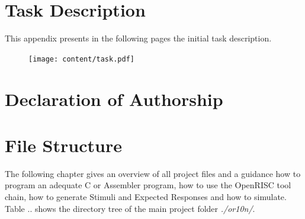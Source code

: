 
\chapter{Task Description}
This appendix presents in the following pages the initial task description. 

\begin{figure}[h!]
  \centering \texttt{[image: content/task.pdf]}
 \end{figure}


\chapter{Declaration of Authorship}

%

%


\chapter{File Structure}
\label{chapt:files}
\addtocounter{table}{1}
The following chapter gives an overview of all project files and a guidance how to program an adequate C or Assembler program, how to use the OpenRISC tool chain, how to generate Stimuli and Expected Responses and how to simulate. Table .. shows the directory tree of the main project folder \textit{./or10n/}.

